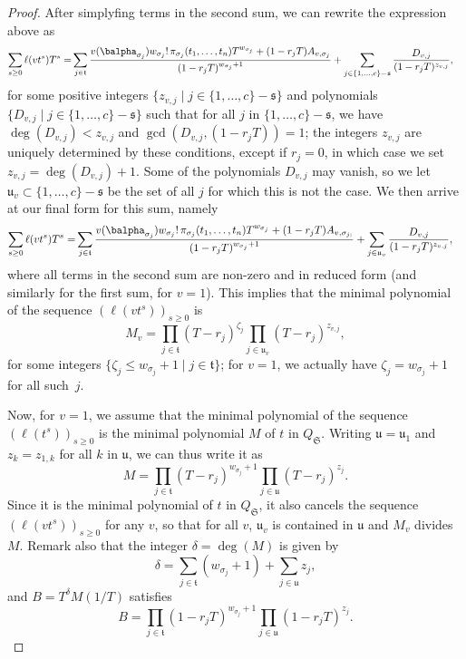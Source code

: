 \documentclass[12pt]{article}
\begin{document}
\begin{proof}
	After simplyfing terms in the second sum, we can rewrite the
	expression above as
	\begin{align*}
	\sum_{s \ge 0} \ell(v t^s)T^s =&
	\sum_{j \in \mathfrak{t}} \frac{
		v(\balpha_{\sigma_{j}})   w_{\sigma_{j}}!\, \pi_{{\sigma_{j}}}(t_1,\dots,t_n)
		T^{w_{\sigma_{j}}} + (1-r_{j}  T)A_{v,\sigma_{j}}}
	{(1-r_{j} T)^{w_{\sigma_{j}}+1}}  
	+\sum_{j \in  \{1,\dots,c\}-\mathfrak{s}}
	\frac{D_{v,j}}
	{(1-r_{j} T)^{z_{v,j}}},
	\end{align*}
	for some positive integers $\{z_{v,j} \mid j\in
	\{1,\dots,c\}-\mathfrak{s}\}$ and polynomials $\{D_{v,j} \mid j\in
	\{1,\dots,c\}-\mathfrak{s}\}$ such that for all $j$ in $
	\{1,\dots,c\}-\mathfrak{s}$, we have $\deg(D_{v,j}) < z_{v,j}$ and
	$\gcd(D_{v,j}, (1-r_{j} T))=1$; the integers $z_{v,j}$ are uniquely
	determined by these conditions, except if $r_{j}=0$, in which case we
	set $z_{v,j}=\deg(D_{v,j})+1$. Some of the polynomials $D_{v,j}$ may
	vanish, so we let $\mathfrak{u}_v \subset \{1,\dots,c\}-\mathfrak{s}$
	be the set of all $j$ for which this is not the case. 
	We then arrive at our final form for this sum, namely
	\begin{align}\label{eq:sumgenseries_collect1}
	\sum_{s \ge 0} \ell(v t^s)T^s =&
	\sum_{j \in \mathfrak{t}} \frac{
		v(\balpha_{\sigma_{j}})   w_{\sigma_{j}}!\, \pi_{{\sigma_{j}}}(t_1,\dots,t_n)
		T^{w_{\sigma_{j}}} + (1-r_{j}  T)A_{v,\sigma_{j;}}}
	{(1-r_{j} T)^{w_{\sigma_{j}}+1}}  
	+\sum_{j \in  \mathfrak{u}_v}
	\frac{D_{v,j}}
	{(1-r_{j} T)^{z_{v,j}}},
	\end{align}
	where all terms in the second sum are non-zero and in reduced form
	(and similarly for the first sum, for $v=1$).
	This implies that the minimal
	polynomial of the sequence $(\ell(vt^s))_{s \ge 0}$ is 
	$$M_v=\prod_{j \in \mathfrak{t}} (T-r_{j})^{\zeta_j} \prod_{j
		\in \mathfrak{u}_v} (T-r_{j})^{z_{v,j}},$$
	for some integers $\{\zeta_j \le w_{\sigma_{j}}+1 \mid j \in \mathfrak{t}\}$; for $v=1$, 
	we actually have $\zeta_j = w_{\sigma_{j}}+1$ for all such~$j$.
	
	Now, for $v=1$, we assume that the minimal polynomial of the sequence
	$(\ell(t^s))_{s \ge 0}$ is the minimal polynomial $M$ of $t$ in
	$Q_\mathfrak{S}$.  Writing $\mathfrak{u}=\mathfrak{u}_1$ and
	$z_k=z_{1,k}$ for all $k$ in $\mathfrak{u}$, we can thus write it as
	$$M=\prod_{j \in \mathfrak{t}} (T-r_{j})^{w_{\sigma_{j}}+1} \prod_{j
		\in \mathfrak{u}} (T-r_{j})^{z_{j}}.$$ Since it is the minimal
	polynomial of $t$ in $Q_\mathfrak{S}$, it also cancels the sequence
	$(\ell(v t^s))_{s \ge 0}$ for any $v$, so that for all $v$,
	$\mathfrak{u}_v$ is contained in $\mathfrak{u}$ and $M_v$ divides $M$.
	Remark also that the integer $\delta=\deg(M)$ is given by
	$$\delta=\sum_{j \in \mathfrak{t}} (w_{\sigma_j}+1)
	+\sum_{j\in\mathfrak{u}} z_{j},$$
	and $B=T^{\delta}M(1/T)$ satisfies
	$$B=\prod_{j \in \mathfrak{t}}(1-r_{j} T)^{w_{\sigma_j}+1} \prod_{j \in
		\mathfrak{u}}(1-r_{j} T)^{z_{j}}.$$ 
	

\end{proof}
\end{document}
